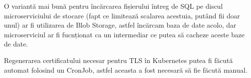 O variantă mai bună pentru încărcarea fișierului întreg de SQL pe discul microserviciului de stocare
(fapt ce limitează scalarea acestuia, putând fii doar unul) ar fi utilizarea de Blob Storage, astfel
încărcam baza de date acolo, dar microserviciul ar fi fucnționat ca un intermediar ce putea să cacheze aceste baze de date.

Regenerarea certificatului necesar pentru TLS în Kubernetes putea fi făcută automat folosind un CronJob, astfel
aceasta a fost necesară să fie făcută manual.

